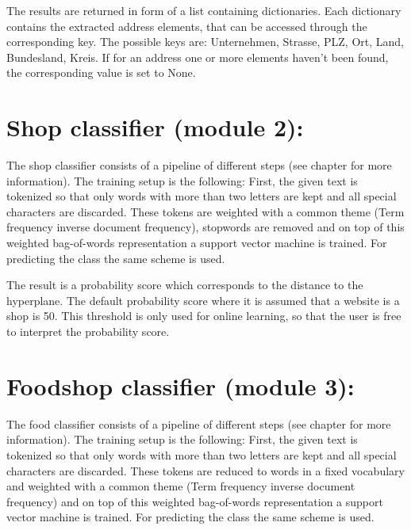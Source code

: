\documentclass[letterpaper,10pt,english]{sphinxmanual}
\begin{document}
The results are returned in form of a list containing
dictionaries. Each dictionary contains the extracted address elements,
that can be accessed through the corresponding key. The possible keys
are: Unternehmen, Strasse, PLZ, Ort, Land, Bundesland, Kreis. If for
an address one or more elements haven’t been found, the corresponding
value is set to None.


\section{Shop classifier (module 2):}
\label{\detokenize{modules:shop-classifier-module-2}}
The shop classifier consists of a pipeline of different steps (see
chapter {\hyperref[\detokenize{training:training-clf}]{}} for more information). The training setup
is the following: First, the given text is tokenized so that only
words with more than two letters are kept and all special characters
are discarded. These tokens are weighted with a common theme (Term
frequency inverse document frequency), stopwords are removed and on
top of this weighted bag-of-words representation a support vector
machine is trained. For predicting the class the same scheme is used.

The result is a probability score which corresponds to the distance to
the hyperplane. The default probability score where it is assumed that
a website is a shop is 50. This threshold is only used for online
learning, so that the user is free to interpret the probability score.


\section{Foodshop classifier (module 3):}
\label{\detokenize{modules:foodshop-classifier-module-3}}
The food classifier consists of a pipeline of different steps (see
chapter {\hyperref[\detokenize{training:training-clf}]{}} for more information). The training setup
is the following: First, the given text is tokenized so that only
words with more than two letters are kept and all special characters
are discarded. These tokens are reduced to words in a fixed vocabulary
and weighted with a common theme (Term frequency inverse document
frequency) and on top of this weighted bag-of-words representation a
support vector machine is trained. For predicting the class the same
scheme is used.
\end{document}
